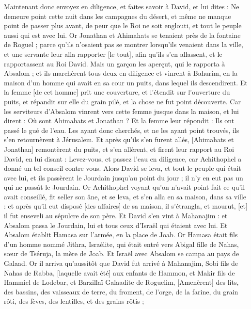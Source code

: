 \begin{multicols}{2}
Maintenant donc envoyez en diligence, et faites savoir à David, et lui dites : Ne demeure point cette nuit dans les campagnes du désert, et même ne manque point de passer plus avant, de peur que le Roi ne soit englouti, et tout le peuple aussi qui est avec lui.
Or Jonathan et Ahimahats se tenaient près de la fontaine de Roguel ; parce qu'ils n'osaient pas se montrer lorsqu'ils venaient dans la ville, et une servante leur alla rapporter [le tout], afin qu'ils s'en allassent, et le rapportassent au Roi David.
Mais un garçon les aperçut, qui le rapporta à Absalom ; et ils marchèrent tous deux en diligence et vinrent à Bahurim, en la maison d'un homme qui avait en sa cour un puits, dans lequel ils descendirent.
Et la femme [de cet homme] prit une couverture, et l'étendit sur l'ouverture du puits, et répandit sur elle du grain pilé, et la chose ne fut point découverte.
Car les serviteurs d'Absalom vinrent vers cette femme jusque dans la maison, et lui dirent : Où sont Ahimahats et Jonathan ? Et la femme leur répondit : Ils ont passé le gué de l'eau. Les ayant donc cherchés, et ne les ayant point trouvés, ils s'en retournèrent à Jérusalem.
Et après qu'ils s'en furent allés, [Ahimahats et Jonathan] remontèrent du puits, et s'en allèrent, et firent leur rapport au Roi David, en lui disant : Levez-vous, et passez l'eau en diligence, car Achithophel a donné un tel conseil contre vous.
Alors David se leva, et tout le peuple qui était avec lui, et ils passèrent le Jourdain jusqu'au point du jour ; il n'y en eut pas un qui ne passât le Jourdain.
Or Achithophel voyant qu'on n'avait point fait ce qu'il avait conseillé, fit seller son âne, et se leva, et s'en alla en sa maison, dans sa ville : et après qu'il eut disposé [des affaires] de sa maison, il s'étrangla, et mourut, [et] il fut enseveli au sépulcre de son père.
Et David s'en vint à Mahanajim : et Absalom passa le Jourdain, lui et tous ceux d'Israël qui étaient avec lui.
Et Absalom établit Hamasa sur l'armée, en la place de Joab. Or Hamasa était fils d'un homme nommé Jithra, Israélite, qui était entré vers Abigal fille de Nahas, sœur de Tséruja, la mère de Joab.
Et Israël avec Absalom se campa au pays de Galaad.
Or il arriva qu'aussitôt que David fut arrivé à Mahanajim, Sobi fils de Nahas de Rabba, [laquelle avait été] aux enfants de Hammon, et Makir fils de Hammiel de Lodebar, et Barzillaï Galaadite de Roguelim,
[Amenèrent] des lits, des bassins, des vaisseaux de terre, du froment, de l'orge, de la farine, du grain rôti, des fèves, des lentilles, et des grains rôtis ;

\end{multicols}
